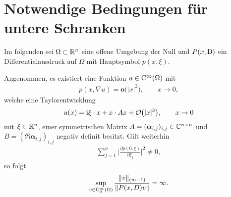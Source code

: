 \section{Notwendige Bedingungen für untere Schranken}
Im folgenden sei $\Omega \subset \mathbb R^n$ eine offene Umgebung der Null und $P(x,\mathrm D)$ ein Differentialausdruck auf $\Omega$ mit Hauptsymbol $p(x,\xi)$. 
\begin{lem}\label{lem1}
Angenommen, es existiert eine Funktion $u \in \mathrm C^\infty (\Omega)$ mit 
\begin{align}
\label{grad}
p(x, \nabla u) = \mathbf{o} \big(|x|^2\big), \qquad  x \rightarrow 0,
\end{align}
welche eine Taylorentwicklung 
\begin{align}\label{taylor}
u(x) = \mathrm i \xi\cdot x + x\cdot A x + \mathcal O\big(|x|^3\big),\qquad x\to0
\end{align}
mit $\xi\in\mathbb R^n$, einer symmetrischen Matrix $A=(\boldsymbol\alpha_{i,j})_{i,j}\in\mathbb C^{n\times n}$ und $B = (\Re \boldsymbol\alpha_{i,j})_{i,j} $ negativ definit  besitzt. 
Gilt weiterhin  
\begin{align}
\label{normpart}
\sum_{j=1}^{n}\bigg|\frac{\partial p(0,\xi)}{\partial \xi_j}\bigg|^2 \neq 0,
\end{align}
so folgt
\begin{align}
\label{lm 1 eq}
\sup_{v\in\mathrm C_0^\infty(\Omega)} \frac{ \lVert v \rVert_{(m-1)} }{ \lVert P(x,D)v \rVert} = \infty.
\end{align}
\end{lem}
